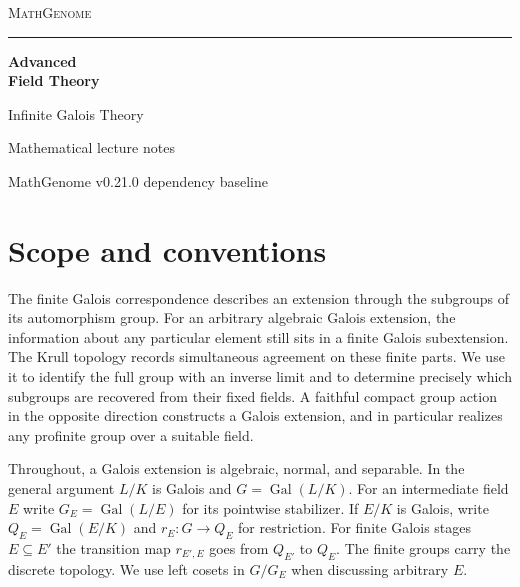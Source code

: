 \documentclass[11pt,oneside,openany]{book}
\theoremstyle{definition}
\theoremstyle{remark}
\begin{document}
\frontmatter
\hypersetup{pageanchor=false}
\begin{titlepage}
\thispagestyle{empty}
\begin{flushleft}
\vspace*{0.65in}
{\large\scshape\color{deepgreen}MathGenome\par}
\vspace{0.35in}
{\color{rulegreen}\rule{0.94\textwidth}{0.65pt}\par}
\vspace{0.43in}
{\color{ink}\fontsize{36}{42}\selectfont\bfseries
Advanced\\[4pt] Field Theory\par}
\vspace{0.32in}
{\color{deepgreen}\Large Infinite Galois Theory\par}
\vfill
{\large Mathematical lecture notes\par}
\vspace{0.10in}
{\normalsize MathGenome v0.21.0 dependency baseline\par}
\vspace*{0.45in}
\end{flushleft}
\end{titlepage}
\hypersetup{pageanchor=true}

\tableofcontents

\chapter*{Scope and conventions}

The finite Galois correspondence describes an extension through the
subgroups of its automorphism group. For an arbitrary algebraic Galois
extension, the information about any particular element still sits in a
finite Galois subextension. The Krull topology records simultaneous
agreement on these finite parts. We use it to identify the full group
with an inverse limit and to determine precisely which subgroups are
recovered from their fixed fields. A faithful compact group action in
the opposite direction constructs a Galois extension, and in particular
realizes any profinite group over a suitable field.

Throughout, a Galois extension is algebraic, normal, and separable.
In the general argument \(L/K\) is Galois and
\(G=\operatorname{Gal}(L/K)\). For an intermediate field \(E\) write
\(G_E=\operatorname{Gal}(L/E)\) for its pointwise stabilizer.
If \(E/K\) is Galois, write \(Q_E=\operatorname{Gal}(E/K)\) and
\(r_E:G\to Q_E\) for restriction. For finite Galois stages
\(E\subseteq E'\) the transition map \(r_{E',E}\) goes from
\(Q_{E'}\) to \(Q_E\). The finite groups carry the discrete topology.
We use left cosets in \(G/G_E\) when discussing arbitrary \(E\).
\end{document}
